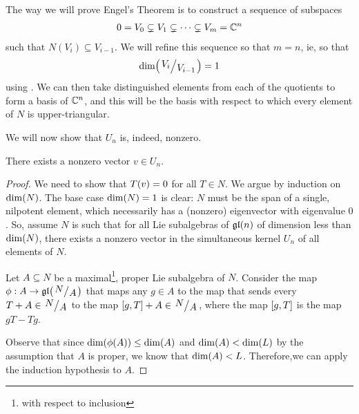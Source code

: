 
The way we will prove Engel's Theorem is to construct a sequence of subspaces
\begin{align*}
    0 = V_0 \subsetneq V_1 \subsetneq \cdots \subsetneq V_m = \mathbb{C}^n
\end{align*}
such that $N(V_i) \subseteq V_{i - 1}$. We will refine this sequence so that $m = n$, ie, so that
\begin{align*}
    \pdim{\quotient{V_{i}}{V_{i - 1}}} = 1
\end{align*}
using . We can then take distinguished elements from each of the quotients to form a basis of $\mathbb{C}^n$, and this will be the basis with respect to which every element of $N$ is upper-triangular.

We will now show that $U_n$ is, indeed, nonzero.

\begin{boxlemma}
    There exists a nonzero vector $v \in U_n$.
\end{boxlemma}
\begin{proof}
    We need to show that $T\!\left( v \right) = 0$ for all $T \in N$. We argue by induction on $\dim\!\left( N \right)$. The base case $\dim\!\left( N \right) = 1$ is clear: $N$ must be the span of a single, nilpotent element, which necessarily has a (nonzero) eigenvector with eigenvalue $0$. So, assume $N$ is such that for all Lie subalgebras of $\mathfrak{gl}\!\left( n \right)$ of dimension less than $\dim\!\left( N \right)$, there exists a nonzero vector in the simultaneous kernel $U_n$ of all elements of $N$.
    
    Let $A \subseteq N$ be a maximal\footnote{with respect to inclusion}, proper Lie subalgebra of $N$. Consider the map $\phi : A \to \gl{\quotient{N}{A}}$ that maps any $g \in A$ to the map that sends every $T + A \in \quotient{N}{A}$ to the map $\brac{g, T} + A \in \quotient{N}{A}$, where the map $\left[ g, T \right]$ is the map $gT - Tg$. %

    Observe that since $\dim\!\left( \phi\!\left( A \right) \right) \leq \dim\!\left( A \right)$ and $\dim\!\left( A \right) < \dim\!\left( L \right)$ by the assumption that $A$ is proper, we know that $\dim\!\left( A \right) < L$. Therefore,we can apply the induction hypothesis to $A$.
    \sorry
\end{proof}


